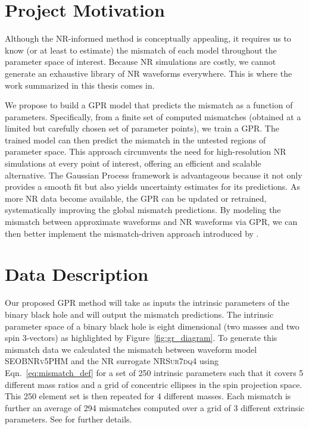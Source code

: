 \documentclass{ucdgradtaughtthesis}
\begin{document}
\section{Project Motivation}
Although the NR-informed method is conceptually appealing, it requires us to know (or at least to estimate) 
the mismatch of each model throughout the parameter space of interest. Because
NR simulations are costly, we cannot generate an exhaustive library of NR waveforms
everywhere. This is where the work summarized in this thesis comes in.
%

We propose to build a GPR model that predicts the mismatch as a function of parameters. Specifically, from a finite set of computed mismatches (obtained at a limited but carefully chosen set of parameter points), we train a GPR.
The trained model can then predict the mismatch in the untested regions of parameter space. This approach circumvents the need for high-resolution NR simulations at every point of interest,
offering an efficient and scalable alternative. The Gaussian Process framework is advantageous because it not only provides a smooth fit but also yields uncertainty estimates for its predictions.
As more NR data become available, the GPR can be updated or retrained, systematically improving the global mismatch predictions.
By modeling the mismatch between approximate waveforms and NR waveforms via GPR, we can then better implement the mismatch-driven approach introduced by \cite{Ogpaper}. 

\section{Data Description}
\label{sec:data_description}
Our proposed GPR method will take as inputs the intrinsic parameters of the binary black hole and will output the mismatch predictions.
The intrinsic parameter space of a binary black hole is eight dimensional (two masses and two spin 3-vectors) as highlighted by Figure~\ref{fig:gr_diagram}. 
To generate this mismatch data we calculated the mismatch between waveform model \textsc{SEOBNRv5PHM} \cite{bestNRfitS} and the NR surrogate \textsc{NRSur7dq4} \cite{NRsurrogate} using Eqn.~\eqref{eq:mismatch_def} for a set of 250 intrinsic parameters 
such that it covers 5 different mass ratios and a grid of concentric ellipses in the spin projection space.
This 250 element set is then repeated for 4 different masses.
Each mismatch is further an average of 294 mismatches computed over a grid of 3 different extrinsic parameters.
See \cite{Ogpaper} for further details.
%
\end{document}
